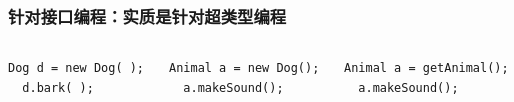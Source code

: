 \documentclass[compress]{beamer}
\begin{document}
\begin{frame}[fragile]
  \frametitle{针对接口编程：实质是针对超类型编程}
  \begin{columns}
    \column{0.5\hsize}
    \column{0.5\hsize}
\begin{Verbatim}[label=针对实现编程]
  Dog d = new Dog( ); 
  d.bark( );
\end{Verbatim}
\pause
\vspace*{2ex}
\begin{Verbatim}[label=针对接口编程]
  Animal a = new Dog(); 
  a.makeSound(); 
\end{Verbatim}
\pause
\vspace*{2ex}
\begin{Verbatim}[label=动态实例化]
  Animal a = getAnimal(); 
  a.makeSound(); 
\end{Verbatim}

  \end{columns}

\end{frame}
\end{document}
